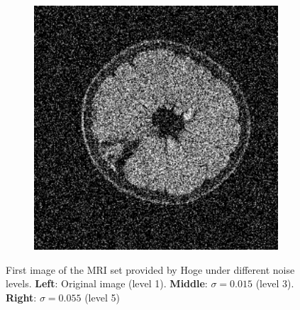 \begin{figure}[htpb]
\begin{subfigure}{0.33\textwidth}
\end{subfigure}%
\begin{subfigure}{0.33\textwidth}
	\includegraphics[width=1\textwidth]{img/grapeMRILevel5}
\end{subfigure}%
\caption{First image of the MRI set provided by Hoge \cite{Hoge_2003} under different noise levels. \textbf{Left}: Original image (level 1). \textbf{Middle}: $\sigma=0.015$ (level 3). \textbf{Right}: $\sigma=0.055$ (level 5)}
\label{fig:grapefruitMRI}	
\end{figure}

